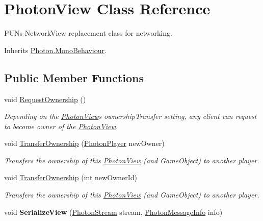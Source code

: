 \hypertarget{class_photon_view}{}\section{Photon\+View Class Reference}
\label{class_photon_view}


P\+UN\textquotesingle{}s Network\+View replacement class for networking.  




Inherits \hyperlink{class_photon_1_1_mono_behaviour}{Photon.\+Mono\+Behaviour}.

\subsection*{Public Member Functions}
\begin{DoxyCompactItemize}
\item 
void \hyperlink{class_photon_view_a0eee05bdd9c48c263a41ccfec45b8651}{Request\+Ownership} ()
\begin{DoxyCompactList}\small\item\em Depending on the \hyperlink{class_photon_view}{Photon\+View}\textquotesingle{}s ownership\+Transfer setting, any client can request to become owner of the \hyperlink{class_photon_view}{Photon\+View}. \end{DoxyCompactList}\item 
void \hyperlink{class_photon_view_a484df6eca8208330c00c317334dd8115}{Transfer\+Ownership} (\hyperlink{class_photon_player}{Photon\+Player} new\+Owner)
\begin{DoxyCompactList}\small\item\em Transfers the ownership of this \hyperlink{class_photon_view}{Photon\+View} (and Game\+Object) to another player. \end{DoxyCompactList}\item 
void \hyperlink{class_photon_view_ad892c308b04787c06907120e64f6bc03}{Transfer\+Ownership} (int new\+Owner\+Id)
\begin{DoxyCompactList}\small\item\em Transfers the ownership of this \hyperlink{class_photon_view}{Photon\+View} (and Game\+Object) to another player. \end{DoxyCompactList}\item 
void {\bfseries Serialize\+View} (\hyperlink{class_photon_stream}{Photon\+Stream} stream, \hyperlink{class_photon_message_info}{Photon\+Message\+Info} info)\hypertarget{class_photon_view_af1871faa617868760d00e59d443d2ad8}{}\label{class_photon_view_af1871faa617868760d00e59d443d2ad8}


\end{DoxyCompactItemize}
